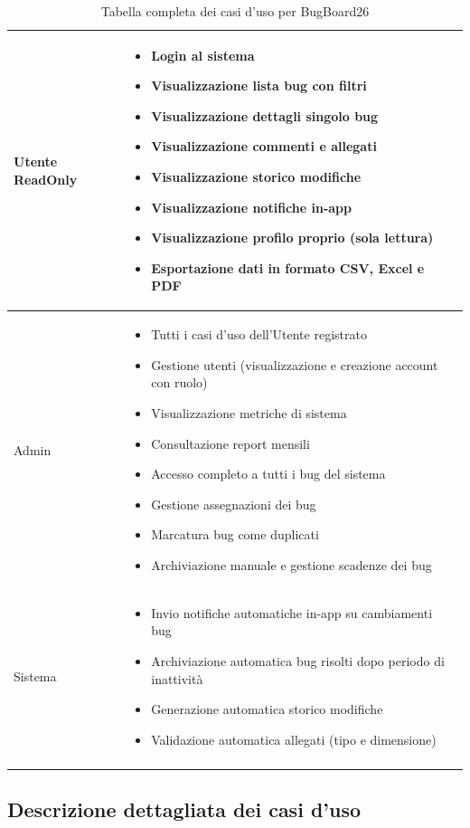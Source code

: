 ﻿\documentclass[a4paper,11pt]{article}
\begin{document}
\begin{longtable}{|p{3cm}|p{11cm}|}
\hline
Utente ReadOnly &
\begin{itemize}[nosep,leftmargin=*]
  \item Login al sistema
  \item Visualizzazione lista bug con filtri
  \item Visualizzazione dettagli singolo bug
  \item Visualizzazione commenti e allegati
  \item Visualizzazione storico modifiche
  \item Visualizzazione notifiche in-app
  \item Visualizzazione profilo proprio (sola lettura)
  \item Esportazione dati in formato CSV, Excel e PDF
\end{itemize} \\
\hline
Admin &
\begin{itemize}[nosep,leftmargin=*]
  \item Tutti i casi d'uso dell'Utente registrato
  \item Gestione utenti (visualizzazione e creazione account con ruolo)
  \item Visualizzazione metriche di sistema
  \item Consultazione report mensili
  \item Accesso completo a tutti i bug del sistema
  \item Gestione assegnazioni dei bug
  \item Marcatura bug come duplicati
  \item Archiviazione manuale e gestione scadenze dei bug
\end{itemize} \\
\hline
Sistema &
\begin{itemize}[nosep,leftmargin=*]
  \item Invio notifiche automatiche in-app su cambiamenti bug
  \item Archiviazione automatica bug risolti dopo periodo di inattivit\`a
  \item Generazione automatica storico modifiche
  \item Validazione automatica allegati (tipo e dimensione)
\end{itemize} \\
\hline
\caption{Tabella completa dei casi d'uso per BugBoard26}
\end{longtable}

\subsection{Descrizione dettagliata dei casi d'uso}
\end{document}
